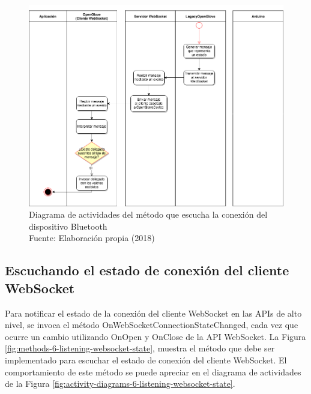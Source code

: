 \begin{figure}[H]
  \begin{center} 
   	\includegraphics[width=1.0\textwidth]{images/chapter04/ActivityDiagrams-ListeningMessagesFromOpenGloveDevice.png} 
   	\captionsetup{justification=centering}
    \caption[Diagrama de actividades del método que escucha la conexión del dispositivo Bluetooth]{Diagrama de actividades del método que escucha la conexión del dispositivo Bluetooth\\Fuente: Elaboración propia (2018)}
    \label{fig:activity-diagrams-5-listening-bluetoothdevice-state}
  \end{center}
\end{figure}


\subsection{Escuchando el estado de conexión del cliente WebSocket}
\label{subsection:listening-openglove-arduino}
Para notificar el estado de la conexión del cliente WebSocket en las APIs de alto nivel, se invoca el método OnWebSocketConnectionStateChanged, cada vez que ocurre un cambio utilizando OnOpen y OnClose de la API WebSocket. La Figura \ref{fig:methods-6-listening-websocket-state}, muestra el método que debe ser implementado para escuchar el estado de conexión del cliente WebSocket. El comportamiento de este método se puede apreciar en el diagrama de actividades de la Figura \ref{fig:activity-diagrams-6-listening-websocket-state}.


